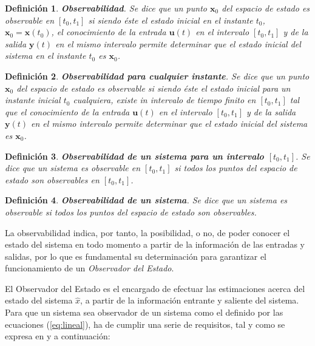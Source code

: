 \newtheorem{defin}{Definición}

\begin{defin} \textbf{Observabilidad}.
Se dice que un punto $\boldsymbol{x}_0$ del espacio de estado es observable en $[t_0,t_1]$ si siendo éste el estado inicial en el instante $t_0$, $\boldsymbol{x}_0 = \boldsymbol{x}(t_0)$, el conocimiento de la entrada $\boldsymbol{u}(t)$ en el intervalo $[t_0,t_1]$ y de la salida $\boldsymbol{y}(t)$ en el mismo intervalo permite determinar que el estado inicial del sistema en el instante $t_0$ es $\boldsymbol{x}_0$.
\end{defin}

\begin{defin} \textbf{Observabilidad para cualquier instante}.
Se dice que un punto $\boldsymbol{x}_0$ del espacio de estado es observable si siendo éste el estado inicial para un instante inicial $t_0$ cualquiera, existe in intervalo de tiempo finito en $[t_0,t_1]$ tal que el conocimiento de la entrada $\boldsymbol{u}(t)$ en el intervalo $[t_0,t_1]$ y de la salida $\boldsymbol{y}(t)$ en el mismo intervalo permite determinar que el estado inicial del sistema es $\boldsymbol{x}_0$.
\end{defin}

\begin{defin} \textbf{Observabilidad de un sistema para un intervalo $[t_0,t_1]$}.
Se dice que un sistema es observable en $[t_0,t_1]$ si todos los puntos del espacio de estado son observables en $[t_0,t_1]$.
\end{defin}

\begin{defin} \textbf{Observabilidad de un sistema}.
Se dice que un sistema es observable si todos los puntos del espacio de estado son observables.
\end{defin}

La observabilidad indica, por tanto, la posibilidad, o no, de poder conocer el estado del sistema en todo momento a partir de la información de las entradas y salidas, por lo que es fundamental su determinación para garantizar el funcionamiento de un \emph{Observador del Estado}. \par 

El Observador del Estado es el encargado de efectuar las estimaciones acerca del estado del sistema $\hat{x}$, a partir de la información entrante y saliente del sistema. Para que un sistema sea observador de un sistema como el definido por las ecuaciones (\ref{eq:lineal}), ha de cumplir una serie de requisitos, tal y como se expresa en \cite{dominguez2000control} y a continuación:

